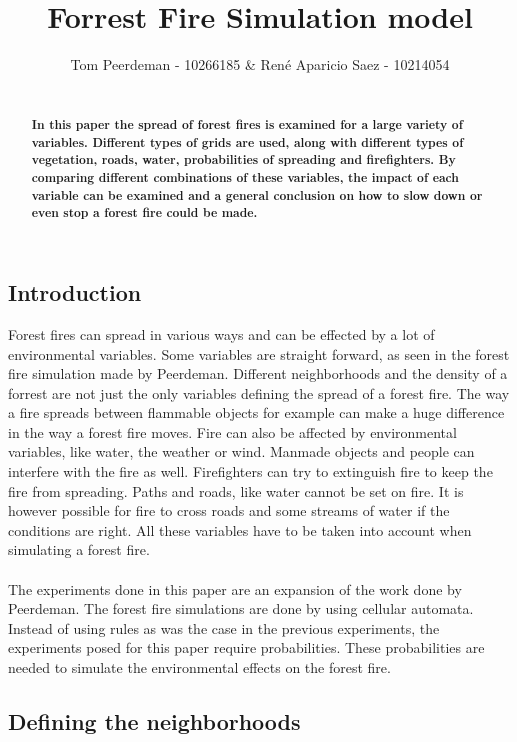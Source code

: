 \documentclass{article}
\title{Forrest Fire Simulation model}
\author{Tom Peerdeman - 10266185 \& Ren\'e Aparicio Saez - 10214054}
\begin{document}
\maketitle

\begin{abstract}
\textbf{\\In this paper the spread of forest fires is examined for a large variety of variables. Different types of grids are used, along with different types of vegetation, roads, water, probabilities of spreading and firefighters. By comparing different combinations of these variables, the impact of each variable can be examined and a general conclusion on how to slow down or even stop a forest fire could be made.}
\end{abstract}

\begin{multicols}{2}

\subsection*{Introduction}
Forest fires can spread in various ways and can be effected by a lot of environmental variables. Some variables are straight forward, as seen in the forest fire simulation made by Peerdeman\cite{oldcode}. Different neighborhoods and the density of a forrest are not just the only variables defining the spread of a forest fire. The way a fire spreads between flammable objects for example can make a huge difference in the way a forest fire moves. Fire can also be affected by environmental variables, like water, the weather or wind. Manmade objects and people can interfere with the fire as well. Firefighters can try to extinguish fire to keep the fire from spreading. Paths and roads, like water cannot be set on fire. It is however possible for fire to cross roads and some streams of water if the conditions are right. All these variables have to be taken into account when simulating a forest fire.\\\\
The experiments done in this paper are an expansion of the work done by Peerdeman\cite{oldcode}. The forest fire simulations are done by using cellular automata. Instead of using rules as was the case in the previous experiments, the experiments posed for this paper require probabilities. These probabilities are needed to simulate the environmental effects on the forest fire. 

\subsection*{Defining the neighborhoods}

\end{multicols}
\end{document}
